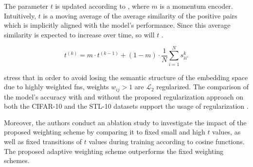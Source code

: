 The parameter $t$ is updated according to , where $m$ is a momentum encoder.
Intuitively, $t$ is a moving average of the average similarity of the positive pairs 
which is implicitly aligned with the model's performance. 
Since this average similarity is expected to increase over time, so will $t$ \citet{curricular_weighting_2024}.

\begin{equation}
    t^{(k)} = m \cdot t^{(k-1)} + (1-m) \cdot \frac{1}{N}\sum_{i=1}^{N}s^{k}_{ii'} 
    \label{eq:curricular_weighting_t_update}
\end{equation}

\citeauthor{curricular_weighting_2024} stress that in order to avoid losing the semantic structure of the embedding space 
due to highly weighted \acp{fn}, weights $w_{ij} > 1$ are $\mathcal{L}_2$ regularized.
The comparison of the model's accuracy with and without the proposed regularization approach on both the CIFAR-10 and the STL-10 datasets 
support the usage of regularization \citet{curricular_weighting_2024}.

Moreover, the authors conduct an ablation study to investigate the impact of the proposed weighting scheme 
by comparing it to fixed small and high $t$ values, as well as fixed transitions of $t$ values during training according to cosine functions.
The proposed adaptive weighting scheme outperforms the fixed weighting schemes.